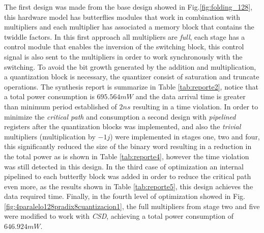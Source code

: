 \documentclass[10pt,times,mathptm,psfig,final,journal,comsoc]{IEEEtran}
\begin{document}
The first design was made from the base design showed in Fig.\ref{fig:folding_128}, this hardware model has butterflies modules that work in combination with multipliers and each multiplier has associated a memory block that contains the twiddle factors. In this first approach all multipliers are \textit{full}, each stage has a control module that enables the inversion of the switching block, this control signal is also sent to the multipliers in order to work synchronously with the switching. To avoid the bit growth generated by the addition and multiplication, a quantization block is necessary, the quantizer consist of  saturation and truncate operations. The synthesis report is summarize in Table \ref{tab:reporte2}, notice that a total power consumption is $695.564 mW$ and the data arrival time is greater than minimum period established of $2ns$ resulting in a time violation.
In order to minimize the \textit{critical path} and consumption a second design with \textit{pipelined} registers after the quantization blocks was implemented, and also the \textit{trivial} multipliers (multiplication by $-1j$) were implemented in stages one, two and four, this significantly reduced the size of the binary word resulting in a reduction in the total power as is shown in Table \ref{tab:reporte4}, however the time violation was still detected in this design.
In the third case of optimization an internal pipelined to each butterfly block was added in order to reduce the critical path even more, as the results shown in Table \ref{tab:reporte5}, this design achieves the data required time.
Finally, in the fourth level of optimization showed in Fig.\ref{fig:4paralelo128pradix8cuantizacion1}, the full multipliers from stage two and five were modified to work with \textit{CSD}, achieving a total power consumption of $646.924 mW$. 





%
%
%
\end{document}
